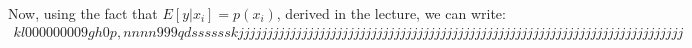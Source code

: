 \documentclass{article}
\begin{document}
Now, using the fact that $ E[y|x_{i}] = p(x_{i})$, derived in the lecture, we can write:
\begin{align*}kl0000000
	
	09
	gh 0p,nnnn999
		qdsssssskjjjjjjjjjjjjjjjjjjjjjjjjjjjjjjjjjjjjjjjjjjjjjjjjjjjjjjjjjjjjjjjjjjjjjjjjjjjjj\\\\\\\\\\\\\\\\\\\\\\\\\\\\\\\\\\\\\\\\\\\\\\\\\\\\\\\\\\\\\\\\\\\\\\\\\\\\\\\\\\\\\\\\\\\\\\\\\\\\\\\\\\\\\\\\\\\\\\\\\\\\\\

\end{align*}
\end{document}
